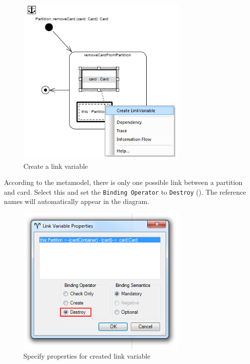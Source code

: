 \begin{stepbystep}
\begin{figure}[htpb]
\begin{center}
  \includegraphics[width=0.75\textwidth]{../../org.moflon.doc.handbook.03_storyDiagrams/03_removeCard/visRemImages/ea_sdmCreateLinkVar}
  \caption{Create a link variable}   
  \label{ea:link_variable}
\end{center}
\end{figure}

\item According to the metamodel, there is only one possible link between a partition and card. Select this and set the
\texttt{Binding Operator} to \texttt{Destroy} (). The reference names will automatically appear in the diagram.

\vspace{0.5cm}

\begin{figure}[h!]
\begin{center} 
 \includegraphics[width=0.75\textwidth]{../../org.moflon.doc.handbook.03_storyDiagrams/03_removeCard/visRemImages/ea_sdmBindLink}
  \caption{Specify properties for created link variable}  
  \label{ea:link_variable_properties}
\end{center}
\end{figure}


\end{stepbystep}
